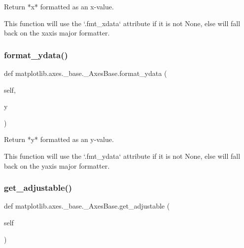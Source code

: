 \begin{DoxyVerb}Return *x* formatted as an x-value.

This function will use the `.fmt_xdata` attribute if it is not None,
else will fall back on the xaxis major formatter.
\end{DoxyVerb}
 \mbox{\label{classmatplotlib_1_1axes_1_1__base_1_1__AxesBase_a96bec767d345751b7a482454a3861789}} 
\subsubsection{\texorpdfstring{format\+\_\+ydata()}{format\_ydata()}}
{\footnotesize\ttfamily def matplotlib.\+axes.\+\_\+base.\+\_\+\+Axes\+Base.\+format\+\_\+ydata (\begin{DoxyParamCaption}\item[{}]{self,  }\item[{}]{y }\end{DoxyParamCaption})}

\begin{DoxyVerb}Return *y* formatted as an y-value.

This function will use the `.fmt_ydata` attribute if it is not None,
else will fall back on the yaxis major formatter.
\end{DoxyVerb}
 \mbox{\label{classmatplotlib_1_1axes_1_1__base_1_1__AxesBase_af71d2d651649e9eb443889e9bddf1ff3}} 
\subsubsection{\texorpdfstring{get\+\_\+adjustable()}{get\_adjustable()}}
{\footnotesize\ttfamily def matplotlib.\+axes.\+\_\+base.\+\_\+\+Axes\+Base.\+get\+\_\+adjustable (\begin{DoxyParamCaption}\item[{}]{self }\end{DoxyParamCaption})}

